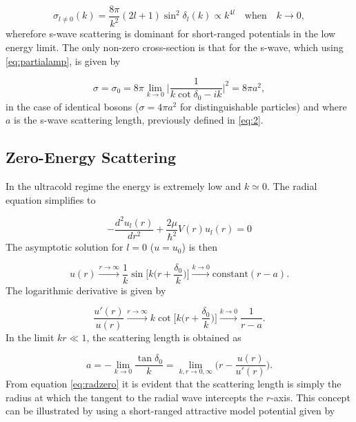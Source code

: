 \begin{equation}
\sigma_{l \neq 0}(k) = \frac{8\pi}{k^2}(2l+1)\sin^2\delta_l(k) \propto k^{4l} \quad \text{when} \quad k \rightarrow 0,
\end{equation}
wherefore s-wave scattering is dominant for short-ranged potentials in the low energy limit. The only non-zero cross-section is that for the s-wave, which using \eqref{eq:partialamp}, is given by

\begin{equation}
\sigma = \sigma_0 = 8\pi \lim_{k \to 0} \bigg|\frac{1}{k\cot\delta_0 -ik}\bigg|^2 = 8\pi a^2,
\end{equation}  
in the case of identical bosons ($\sigma = 4\pi a^2 $ for distinguishable particles) and where $a$ is the s-wave scattering length, previously defined in \eqref{eq:2}.

\subsection{Zero-Energy Scattering}\label{sec:zero_energy_scat}
In the ultracold regime the energy is extremely low and $k\simeq0$. The radial equation simplifies to

\begin{equation}
-\frac{d^2 u_l(r)}{dr^2} + \frac{2\mu}{\hbar^2}V(r)u_l(r) = 0
\end{equation}
The asymptotic solution for $l=0$ ($u = u_0$) is then

\begin{equation}\label{eq:radzero}
u(r) \xrightarrow{ r \to \infty} \frac{1}{k} \sin\bigg[k\Big(r+\frac{\delta_0}{k}\Big)\bigg]  \xrightarrow{k \to 0} \text{constant}(r-a).
\end{equation}
The logarithmic derivative is given by

\begin{equation}
\frac{u'(r)}{u(r)}  \xrightarrow{ r \to \infty} k \cot\bigg[k \Big(r + \frac{\delta_0}{k}\Big)\bigg] \xrightarrow{k \to 0} \frac{1}{r-a}.
\end{equation}
In the limit $kr \ll 1$, the scattering length is obtained as

\begin{equation}
a = -\lim_{k \to 0} \frac{\tan \delta_0 }{k} = \lim_{k,r \to 0,\infty}\Bigg(r-  \frac{u(r)}{u'(r)}\Bigg).
\end{equation}
From equation \eqref{eq:radzero} it is evident that the scattering length is simply the radius at which the tangent to the radial wave intercepts the $r$-axis. This concept can be illustrated by using a short-ranged attractive model potential given by

